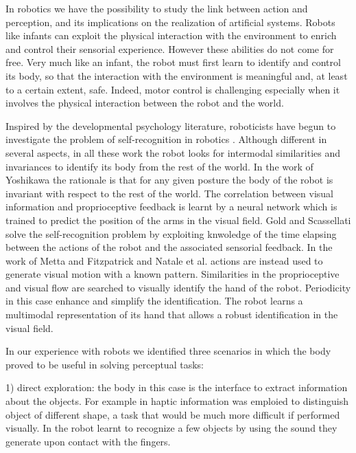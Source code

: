 In robotics we have the possibility to study the link between action and perception, and its implications on the realization of artificial systems. Robots like infants can exploit the physical interaction with the environment to enrich and control their sensorial experience. However these abilities do not come for free. Very much like an infant, the robot must first learn to identify and control its body, so that the interaction with the environment is meaningful and, at least to a certain extent, safe. Indeed, motor control is challenging especially when it involves the physical interaction between the robot and the world. 

Inspired by the developmental psychology literature, roboticists have begun to investigate the problem of self-recognition in robotics \cite{yoshikawa03doestheinvariance,metta03early,natale05exploring,gold05learning}. Although different in several aspects, in all these work the robot looks for intermodal similarities and invariances to identify its body from the rest of the world.
In the work of Yoshikawa \cite{yoshikawa03doestheinvariance} the rationale is that for any given posture the body of the robot is invariant with respect to the rest of the world. The correlation between visual information and proprioceptive feedback is learnt by a neural network which is trained to predict the position of the arms in the visual field.
Gold and Scassellati \cite{gold05learning} solve the self-recognition problem by exploiting knwoledge of the time elapsing between the actions of the robot and the associated sensorial feedback.
In the work of Metta and Fitzpatrick \cite{metta03early} and Natale et al. \cite{natale05exploring} actions are instead used to generate visual motion with a known pattern. Similarities in the proprioceptive and visual flow are searched to visually identify the hand of the robot. Periodicity in this case enhance and simplify the identification. The robot learns a multimodal representation of its hand that allows a robust identification in the visual field.

In our experience with robots we identified three scenarios in which the body proved to be useful in solving perceptual tasks:

1) direct exploration: the body in this case is the interface to extract information about the objects. For example in \cite{natale04learning} haptic information was emploied to distinguish object of different shape, a task that would be much more difficult if performed visually. In \cite{torres-jara05tapping} the robot learnt to recognize a few objects by using the sound they generate upon contact with the fingers.

